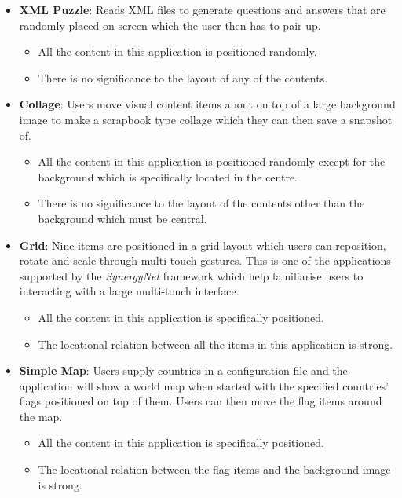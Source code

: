 \documentclass{bmcart}
\begin{document}
\begin{itemize}
  \item \textbf{XML Puzzle}: 
  Reads XML files to generate questions and answers that are randomly placed on screen which the user then has to pair up. 
  \begin{itemize}
    \item  All the content in this application is positioned randomly. 
    \item There is no significance to the layout of any of the contents.
  \end{itemize}
  \item \textbf{Collage}: 
  Users move visual content items about on top of a large background image to make a scrapbook type collage which they can then save a snapshot of. 
    \begin{itemize}
    \item  All the content in this application is positioned randomly except for the background which is specifically located in the centre.
    \item There is no significance to the layout of the contents other than the background which must be central.
  \end{itemize}
  \item \textbf{Grid}: 
  Nine items are positioned in a grid layout which users can reposition, rotate and scale through multi-touch gestures.
  This is one of the applications supported by the {\emph{SynergyNet}} framework which help familiarise users to interacting with a large multi-touch interface. 
    \begin{itemize}
    \item  All the content in this application is specifically positioned.
    \item The locational relation between all the items in this application is strong.
  \end{itemize}
    \item \textbf{Simple Map}: 
  Users supply countries in a configuration file and the application will show a world map when started with the specified countries' flags positioned on top of them. 
  Users can then move the flag items around the map.
    \begin{itemize}
    \item  All the content in this application is specifically positioned.
    \item The locational relation between the flag items and the background image is strong.
  \end{itemize}
\end{itemize}
\end{document}
